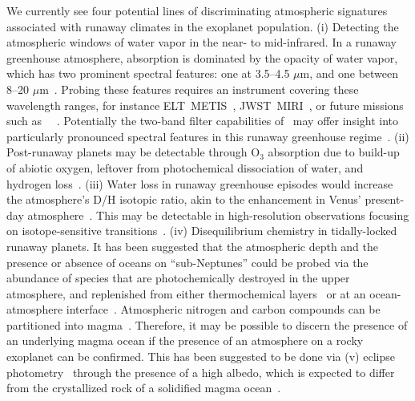 \documentclass[twocolumn,twocolappendix]{aastex631}
\begin{document}
We currently see four potential lines of discriminating atmospheric signatures associated with runaway climates in the exoplanet population.
(i) Detecting the atmospheric windows of water vapor in the near- to mid-infrared.
In a runaway greenhouse atmosphere, absorption is dominated by the opacity of water vapor, which has two prominent spectral features: one at 3.5--4.5 $\mu$m, and one between 8--20 $\mu$m~\citep[e.g.,][]{Boukrouche2021}.
Probing these features requires an instrument covering these wavelength ranges, for instance ELT~METIS~\citep{Brandl2021}, JWST~MIRI~\citep{Rieke2015}, or future missions such as \life\ ~\citep{2019A&A...621A.125B,Quanz2022,2022A&A...664A..22D}.
Potentially the two-band filter capabilities of \plato\ may offer insight into particularly pronounced spectral features in this runaway greenhouse regime~\citep{2020SSRv..216...98G}.
(ii) Post-runaway planets may be detectable through O$_{3}$ absorption due to build-up of abiotic oxygen, leftover from photochemical dissociation of water, and hydrogen loss~\citep{2014ApJ...785L..20W,Luger2015}.
(iii) Water loss in runaway greenhouse episodes would increase the atmosphere's D/H isotopic ratio, akin to the enhancement in Venus' present-day atmosphere~\citep{2019JGRE..124.2015K,2021JGRE..12606643K}.
This may be detectable in high-resolution observations focusing on isotope-sensitive transitions~\citep{2019AJ....158...26L,2019A&A...622A.139M}.
(iv) Disequilibrium chemistry in tidally-locked runaway planets.
It has been suggested that the atmospheric depth and the presence or absence of oceans on ``sub-Neptunes'' could be probed via the abundance of species that are photochemically destroyed in the upper atmosphere, and replenished from either thermochemical layers~\citep{2021ApJ...914...38Y,2021ApJ...922L..27T} or at an ocean-atmosphere interface~\citep{2019ApJ...887..231L,2021ApJ...921L...8H}.
Atmospheric nitrogen and carbon compounds can be partitioned into magma~\citep{2022E&PSL.59817847G,2022PSJ.....3...93B}.
Therefore, it may be possible to discern the presence of an underlying magma ocean if the presence of an atmosphere on a rocky exoplanet can be confirmed.
This has been suggested to be done via (v) eclipse photometry~\citep{Mansfield2019,2019ApJ...886..140K} through the presence of a high albedo, which is expected to differ from the crystallized rock of a solidified magma ocean~\citep{2020ApJ...898..160E,Fortin2022}.
\end{document}

